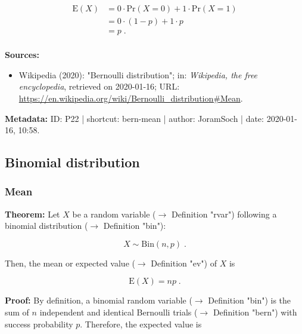 \documentclass[a4paper,12pt]{book}
\begin{document}
\begin{equation} \label{eq:bern-mean-bern-mean-qed}
\begin{split}
\mathrm{E}(X) &= 0 \cdot \mathrm{Pr}(X = 0) + 1 \cdot \mathrm{Pr}(X = 1) \\
&= 0 \cdot (1-p) + 1 \cdot p \\
&= p \; . \\
\end{split}
\end{equation}

\vspace{1em}
\textbf{Sources:}
\begin{itemize}
\item Wikipedia (2020): "Bernoulli distribution"; in: \textit{Wikipedia, the free encyclopedia}, retrieved on 2020-01-16; URL: \url{https://en.wikipedia.org/wiki/Bernoulli_distribution#Mean}.
\end{itemize}


\vspace{1em}
\textbf{Metadata:} ID: P22 | shortcut: bern-mean | author: JoramSoch | date: 2020-01-16, 10:58.


\subsection{Binomial distribution}

\subsubsection[\textbf{Mean}]{Mean} \label{sec:bin-mean}

\vspace{1em}
\textbf{Theorem:} Let $X$ be a random variable ($\rightarrow$ Definition "rvar") following a binomial distribution ($\rightarrow$ Definition "bin"):

\begin{equation} \label{eq:bin-mean-bin}
X \sim \mathrm{Bin}(n,p) \; .
\end{equation}

Then, the mean or expected value ($\rightarrow$ Definition "ev") of $X$ is

\begin{equation} \label{eq:bin-mean-bin-mean}
\mathrm{E}(X) = n p \; .
\end{equation}


\vspace{1em}
\textbf{Proof:} By definition, a binomial random variable ($\rightarrow$ Definition "bin") is the sum of $n$ independent and identical Bernoulli trials ($\rightarrow$ Definition "bern") with success probability $p$. Therefore, the expected value is
\end{document}
